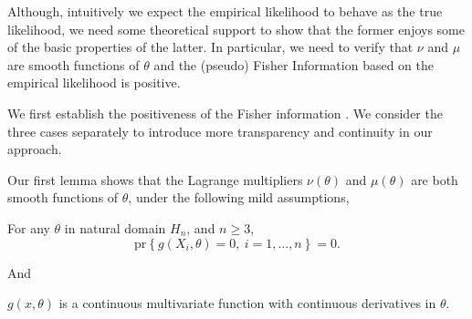 Although, intuitively we expect the empirical likelihood to behave
as the true likelihood, we need some theoretical support to show that
the former enjoys some of the basic properties of the latter. In particular,
we need to verify that $\nu$ and $\mu$ are smooth functions of $\theta$
and the (pseudo) Fisher Information based on the empirical likelihood
is positive. 

We first establish the positiveness of the Fisher information . We
consider the three cases separately to introduce more transparency
and continuity in our approach. 

Our first lemma shows that the Lagrange multipliers $\nu\left(\theta\right)$
and $\mu\left(\theta\right)$ are both smooth functions of $\theta$, under the following mild assumptions,
\begin{assumption}
\label{ass:denom-not-zero} 
For any $\theta$ in natural domain $H_n$, and $n\ge 3$,
\[
	\mathrm{pr}\left\{ g(X_i,\theta)=0, \: i=1,\ldots,n \right\}=0.
\]
\end{assumption}
And 
\begin{assumption}
\label{ass:first-order-smooth-g}
$g(x,\theta)$ is a continuous multivariate function with continuous derivatives in $\theta$.
\end{assumption}

